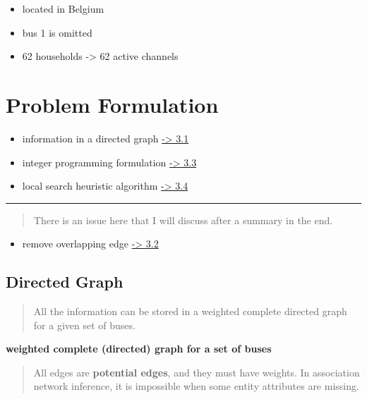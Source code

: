 \documentclass[
]{book}
\providecommand{\tightlist}{%
  \setlength{\itemsep}{0pt}\setlength{\parskip}{0pt}}
\begin{document}
\begin{itemize}
\tightlist
\item
  located in Belgium
\item
  bus 1 is omitted
\item
  62 households -\textgreater{} 62 active channels
\end{itemize}

\hypertarget{problem-formulation}{%
\chapter{Problem Formulation}\label{problem-formulation}}

\begin{itemize}
\tightlist
\item
  information in a directed graph \href{directed}{-\textgreater{} 3.1}
\item
  integer programming formulation \protect\hyperlink{IP}{-\textgreater{} 3.3}
\item
  local search heuristic algorithm \protect\hyperlink{combinatorial}{-\textgreater{} 3.4}
\end{itemize}

\begin{center}\rule{0.5\linewidth}{0.5pt}\end{center}

\begin{quote}
There is an issue here that I will discuss after a summary in the end.
\end{quote}

\begin{itemize}
\tightlist
\item
  remove overlapping edge \protect\hyperlink{overlapping}{-\textgreater{} 3.2}
\end{itemize}

\hypertarget{directed}{%
\section{Directed Graph}\label{directed}}

\begin{quote}
All the information can be stored in a weighted complete directed graph for a
given set of buses.
\end{quote}

\textbf{weighted complete (directed) graph for a set of buses}

\begin{quote}
All edges are \textbf{potential edges}, and they must have weights. In association
network inference, it is impossible when some entity attributes are missing.
\end{quote}
\end{document}
